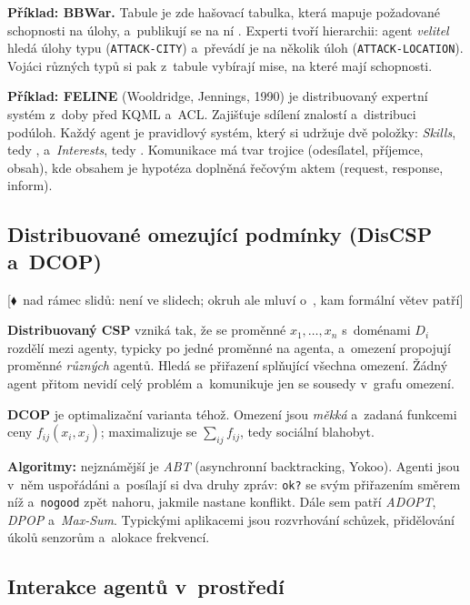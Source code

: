 \documentclass[11pt,a4paper]{article}
\theoremstyle{definition}
\newcommand{\mimoq}[1]{\textcolor{markcol}{\textsf{\footnotesize[$\blacklozenge$~nad rámec slidů: #1]}}}
\begin{document}
\medskip
\noindent\textbf{Příklad: BBWar.} Tabule je zde hašovací tabulka, která mapuje požadované
schopnosti na úlohy, a~publikují se na ní . Experti tvoří hierarchii: agent
\emph{velitel} hledá úlohy typu  (\texttt{ATTACK-CITY}) a~převádí je na
několik úloh  (\texttt{ATTACK-LOCATION}). Vojáci různých typů si pak
z~tabule vybírají mise, na které mají schopnosti.

\medskip
\noindent\textbf{Příklad: FELINE} (Wooldridge, Jennings, 1990) je distribuovaný expertní systém
z~doby před KQML a~ACL. Zajišťuje sdílení znalostí a~distribuci podúloh. Každý agent je
pravidlový systém, který si udržuje dvě položky: \emph{Skills}, tedy , a~\emph{Interests}, tedy .
Komunikace má tvar trojice (odesílatel, příjemce, obsah), kde obsahem je hypotéza doplněná
řečovým aktem (request, response, inform).

\subsection{Distribuované omezující podmínky (DisCSP a~DCOP)}

\noindent\mimoq{není ve slidech; okruh ale mluví o~\uv{distribuovaném řešení problémů},
kam formální větev patří}

\begin{defbox}
\textbf{Distribuovaný CSP} vzniká tak, že se proměnné $x_1,\dots,x_n$ s~doménami $D_i$ rozdělí
mezi agenty, typicky po jedné proměnné na agenta, a~omezení propojují proměnné \emph{různých}
agentů. Hledá se přiřazení splňující všechna omezení. Žádný agent přitom nevidí celý problém
a~komunikuje jen se sousedy v~grafu omezení.

\textbf{DCOP} je optimalizační varianta téhož. Omezení jsou \emph{měkká} a~zadaná funkcemi ceny
$f_{ij}(x_i,x_j)$; maximalizuje se $\sum_{ij} f_{ij}$, tedy sociální blahobyt.

\textbf{Algoritmy:} nejznámější je \emph{ABT} (asynchronní backtracking, Yokoo). Agenti jsou
v~něm uspořádáni a~posílají si dva druhy zpráv: \texttt{ok?} se svým přiřazením směrem níž
a~\texttt{nogood} zpět nahoru, jakmile nastane konflikt. Dále sem patří \emph{ADOPT},
\emph{DPOP} a~\emph{Max-Sum}. Typickými aplikacemi jsou rozvrhování schůzek, přidělování úkolů
senzorům a~alokace frekvencí.
\end{defbox}
\subsection{Interakce agentů v~prostředí}
\end{document}
